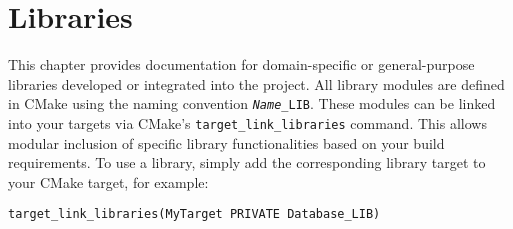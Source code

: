 \chapter{Libraries}
\label{chap:libraries}

This chapter provides documentation for domain-specific or general-purpose libraries developed or integrated into the project. All library modules are defined in CMake using the naming convention \texttt{\textit{Name}\_LIB}. These modules can be linked into your targets via CMake's \texttt{target\_link\_libraries} command. This allows modular inclusion of specific library functionalities based on your build requirements. To use a library, simply add the corresponding library target to your CMake target, for example:
\begin{lstlisting}[style=cppstyle]
target_link_libraries(MyTarget PRIVATE Database_LIB)
\end{lstlisting}